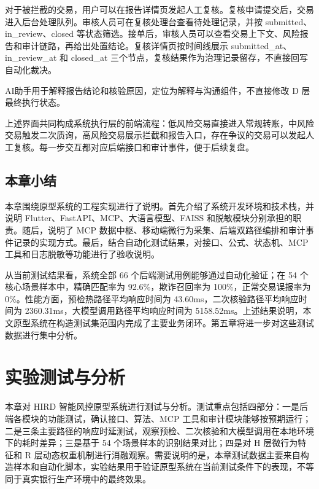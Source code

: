 \documentclass{xduugthesis}
\begin{document}
对于被拦截的交易，用户可以在报告详情页发起人工复核。复核申请提交后，交易进入后台处理队列。审核人员可在复核处理台查看待处理记录，并按 submitted、in\_review、closed 等状态筛选。接单后，审核人员可以查看交易上下文、风险报告和审计链路，再给出处置结论。复核详情页按时间线展示 submitted\_at、in\_review\_at 和 closed\_at 三个节点，复核结果作为治理记录留存，不直接回写自动化裁决。

AI助手用于解释报告结论和核验原因，定位为解释与沟通组件，不直接修改 D 层最终执行状态。


上述界面共同构成系统执行层的前端流程：低风险交易直接进入常规转账，中风险交易触发二次质询，高风险交易展示拦截和报告入口，存在争议的交易可以发起人工复核。每一步交互都对应后端接口和审计事件，便于后续复盘。

\section{本章小结}

本章围绕原型系统的工程实现进行了说明。首先介绍了系统开发环境和技术栈，并说明 Flutter、FastAPI、MCP、大语言模型、FAISS 和脱敏模块分别承担的职责。随后，说明了 MCP 数据中枢、移动端微行为采集、后端双路径编排和审计事件记录的实现方式。最后，结合自动化测试结果，对接口、公式、状态机、MCP 工具和日志脱敏等功能进行了验收说明。

从当前测试结果看，系统全部 66 个后端测试用例能够通过自动化验证；在 54 个核心场景样本中，精确匹配率为 92.6\%，欺诈召回率为 100\%，正常交易误报率为 0\%。性能方面，预检热路径平均响应时间为 43.60ms，二次核验路径平均响应时间为 2360.31ms，大模型调用路径平均响应时间为 5158.52ms。上述结果说明，本文原型系统在构造测试集范围内完成了主要业务闭环。第五章将进一步对这些测试数据进行集中分析。

\chapter{实验测试与分析}

本章对 HIRD 智能风控原型系统进行测试与分析。测试重点包括四部分：一是后端各模块的功能测试，确认接口、算法、MCP 工具和审计模块能够按预期运行；二是三条主要路径的响应时延测试，观察预检、二次核验和大模型调用在本地环境下的耗时差异；三是基于 54 个场景样本的识别结果对比；四是对 H 层微行为特征和 R 层动态权重机制进行消融观察。需要说明的是，本章测试数据主要来自构造样本和自动化脚本，实验结果用于验证原型系统在当前测试条件下的表现，不等同于真实银行生产环境中的最终效果。
\end{document}
